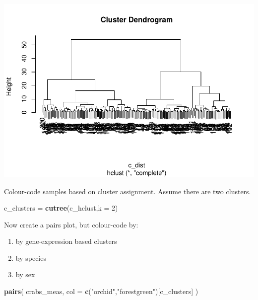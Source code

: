 \documentclass[
]{book}
\newenvironment{Shaded}{\begin{snugshade}}{\end{snugshade}}
\newcommand{\AttributeTok}[1]{\textcolor[rgb]{0.13,0.29,0.53}{#1}}
\newcommand{\DecValTok}[1]{\textcolor[rgb]{0.00,0.00,0.81}{#1}}
\newcommand{\FunctionTok}[1]{\textcolor[rgb]{0.13,0.29,0.53}{\textbf{#1}}}
\newcommand{\NormalTok}[1]{#1}
\newcommand{\OtherTok}[1]{\textcolor[rgb]{0.56,0.35,0.01}{#1}}
\newcommand{\StringTok}[1]{\textcolor[rgb]{0.31,0.60,0.02}{#1}}
\providecommand{\tightlist}{%
  \setlength{\itemsep}{0pt}\setlength{\parskip}{0pt}}
\begin{document}
\includegraphics{_main_files/figure-latex/unnamed-chunk-30-1.pdf}

Colour-code samples based on cluster assignment. Assume there are two clusters.

\begin{Shaded}
\begin{Highlighting}[]
\NormalTok{c\_clusters }\OtherTok{=} \FunctionTok{cutree}\NormalTok{(c\_hclust,}\AttributeTok{k =} \DecValTok{2}\NormalTok{)}
\end{Highlighting}
\end{Shaded}

Now create a pairs plot, but colour-code by:

\begin{enumerate}
\def\labelenumi{\arabic{enumi}.}
\tightlist
\item
  by gene-expression based clusters
\item
  by species
\item
  by sex
\end{enumerate}

\begin{Shaded}
\begin{Highlighting}[]
\FunctionTok{pairs}\NormalTok{(}
\NormalTok{    crabs\_meas, }
    \AttributeTok{col =} \FunctionTok{c}\NormalTok{(}\StringTok{"orchid"}\NormalTok{,}\StringTok{"forestgreen"}\NormalTok{)[c\_clusters]}
\NormalTok{)}
\end{Highlighting}
\end{Shaded}
\end{document}
